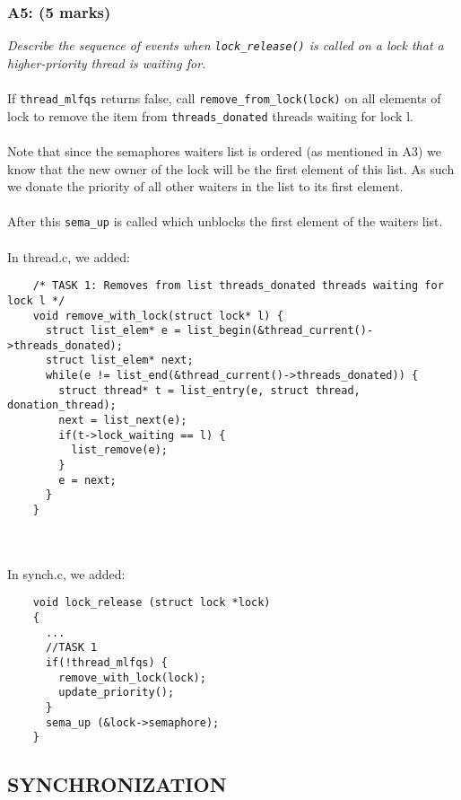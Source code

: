 \documentclass{article}
\begin{document}
\subsubsection*{A5: (5 marks) }
\textit{Describe the sequence of events when \texttt{lock\_release()} is called on a lock that a higher-priority thread is waiting for.}
\\ \\
If \texttt{thread\_mlfqs} returns false, call \texttt{remove\_from\_lock(lock)} on all elements of lock to remove the item from \texttt{threads\_donated} threads waiting for lock l.
\\ \\
Note that since the semaphores waiters list is ordered (as mentioned in A3) we know that the new owner of the lock will be the first element of this list. As such we donate the priority of all other waiters in the list to its first element.
\\ \\
After this \texttt{sema\_up} is called which unblocks the first element of the waiters list.
\\ \\
In thread.c, we added:
\begin{lstlisting}
    /* TASK 1: Removes from list threads_donated threads waiting for lock l */
    void remove_with_lock(struct lock* l) {
      struct list_elem* e = list_begin(&thread_current()->threads_donated);
      struct list_elem* next;
      while(e != list_end(&thread_current()->threads_donated)) {
        struct thread* t = list_entry(e, struct thread, donation_thread);
        next = list_next(e);
        if(t->lock_waiting == l) {
          list_remove(e);
        }
        e = next;
      }
    }
\end{lstlisting}
\\ \\
In synch.c, we added:
\begin{lstlisting}
    void lock_release (struct lock *lock)
    {
      ...
      //TASK 1
      if(!thread_mlfqs) {
        remove_with_lock(lock);
        update_priority();
      }
      sema_up (&lock->semaphore);
    }

\end{lstlisting}



\subsection{SYNCHRONIZATION}
\end{document}
